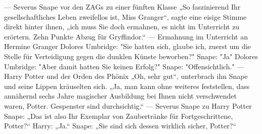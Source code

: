 \documentclass[a4paper, 10pt]{article}
\begin{document}
\vspace{10pt}
\newline
{}  
— Severus Snape vor den ZAGs zu einer fünften Klasse
\vspace{10pt}
\newline
{}  
„So faszinierend Ihr gesellschaftliches Leben zweifellos ist, Miss Granger“, sagte eine eisige Stimme direkt hinter ihnen, „ich muss Sie doch ermahnen, es nicht im Unterricht zu erörtern. Zehn Punkte Abzug für Gryffindor.“
\vspace{10pt}
\newline
{}  
— Ermahnung im Unterricht an Hermine Granger
\vspace{10pt}
\newline
{}  
Dolores Umbridge: "Sie hatten sich, glaube ich, zuerst um die Stelle für Verteidigung gegen die dunklen Künste beworben?"
\vspace{10pt}
\newline
{}  
Snape: "Ja"
\vspace{10pt}
\newline
{}  
Dolores Umbridge: "Aber damit hatten Sie keinen Erfolg?"
\vspace{10pt}
\newline
{}  
Snape: "Offensichtlich."
\vspace{10pt}
\newline
{}  
— Harry Potter und der Orden des Phönix
\vspace{10pt}
\newline
{}  
„Oh, sehr gut“, unterbrach ihn Snape und seine Lippen kräuselten sich. „Ja, man kann ohne weiteres feststellen, dass annähernd sechs Jahre magischer Ausbildung bei Ihnen nicht verschwendet waren, Potter. Gespenster sind durchsichtig.“
\vspace{10pt}
\newline
{}  
— Severus Snape zu Harry Potter
\vspace{10pt}
\newline
{}  
Snape: „Das ist also Ihr Exemplar von Zaubertränke für Fortgeschrittene, Potter?“
\vspace{10pt}
\newline
{}  
Harry: „Ja.“
\vspace{10pt}
\newline
{}  
Snape: „Sie sind sich dessen wirklich sicher, Potter?“
\vspace{10pt}
\end{document}
